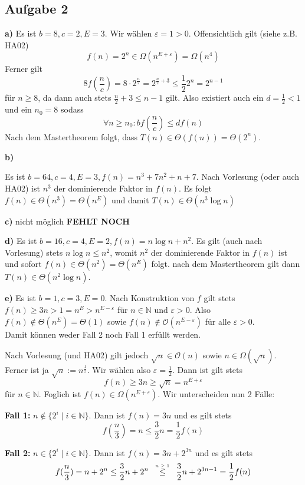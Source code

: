 \documentclass[a4paper,graphics,11pt]{article}
\newcommand{\aufgabe}[1]{\subsection*{Aufgabe #1}}
\newcommand{\up}[2]{\mathrel{\overset{\makebox[0pt]{\mbox{\normalfont\tiny #2}}}{#1}}}
\begin{document}
\newpage
\aufgabe{2}
\textbf{a)}
Es ist $b = 8, c = 2, E = 3$. Wir wählen $\varepsilon = 1 > 0$. Offensichtlich gilt (siehe z.B. HA02)
$$
    f(n) = 2^n \in \Omega(n^{E+\varepsilon}) = \Omega(n^4)
$$
Ferner gilt
$$
    8f\left(\frac{n}{c}\right)
    = 8\cdot 2^\frac{n}{2}
    = 2^{\frac{n}{2}+3}
    \leq \frac{1}{2} 2^n
    = 2^{n-1}
$$
für $n \geq 8$, da dann auch stets $\frac{n}{2} + 3 \leq n-1$ gilt. Also existiert auch ein $d = \frac{1}{2} < 1$ und ein $n_0 = 8$ sodass
$$
    \forall n \geq n_0 : bf(\frac{n}{c}) \leq df(n)
$$
Nach dem Mastertheorem folgt, dass $T(n) \in \Theta(f(n)) = \Theta(2^n)$.

\textbf{b)}

Es ist $b = 64, c = 4, E = 3, f(n) = n^3 + 7n^2 + n + 7$. Nach Vorlesung (oder auch HA02) ist $n^3$ der
dominierende Faktor in $f(n)$. Es folgt
$f(n) \in \Theta(n^3) = \Theta(n^E)$ und damit
$T(n) \in \Theta(n^3\log n)$

\textbf{c)}
nicht möglich
\textbf{FEHLT NOCH}

\textbf{d)}
Es ist $b = 16, c = 4, E = 2, f(n) = n\log n + n^2$.
Es gilt (auch nach Vorlesung) stets $n\log n \leq n^2$, womit $n^2$ der dominierende Faktor in $f(n)$ ist
und sofort $f(n) \in \Theta(n^2) = \Theta(n^E)$ folgt. nach dem Mastertheorem gilt dann
$T(n) \in \Theta(n^2\log n)$.

\textbf{e)}
Es ist $b = 1, c = 3, E = 0$.
Nach Konstruktion von $f$ gilt stets $f(n) \geq 3n > 1 = n^{E} > n^{E-\varepsilon}$ für $n \in \mathbb{N}$ und
$\varepsilon > 0$. Also $f(n) \notin \Theta(n^E) = \Theta(1)$ sowie $f(n) \notin \mathcal{O}(n^{E - \varepsilon})$ für alle $\varepsilon > 0$.\\
Damit können weder Fall 2 noch Fall 1 erfüllt werden.

Nach Vorlesung (und HA02) gilt jedoch $\sqrt{n} \in \mathcal{O}(n)$ sowie $n \in \Omega(\sqrt{n})$.
Ferner ist ja $\sqrt{n} := n^{\frac{1}{2}}$. Wir wählen also $\varepsilon = \frac{1}{2}$.
Dann ist gilt stets
$$
    f(n) \geq 3n \geq \sqrt{n} = n^{E+\varepsilon}
$$
für $n \in \mathbb{N}$.
Foglich ist $f(n) \in \Omega(n^{E+\varepsilon})$. Wir unterscheiden nun 2 Fälle:

\textbf{Fall 1:} $n \notin \{2^i \mid i \in \mathbb{N}\}$. Dann ist $f(n) = 3n$ und es gilt stets
$$
    f(\frac{n}{3}) = n \leq \frac{3}{2} n = \frac{1}{2} f(n)
$$

\textbf{Fall 2:} $n \in \{2^i \mid i\in \mathbb{N} \}$. Dann ist $f(n) = 3n + 2^{3n}$ und es gilt stets
$$ 
    f(\frac{n}{3}) = n+2^n
    \leq \frac{3}{2}n + 2^{n}
    \quad\up{\leq}{$n \geq 1$}\quad \frac{3}{2}n + 2^{3n - 1}
    = \frac{1}{2} f(n)
$$
\end{document}
